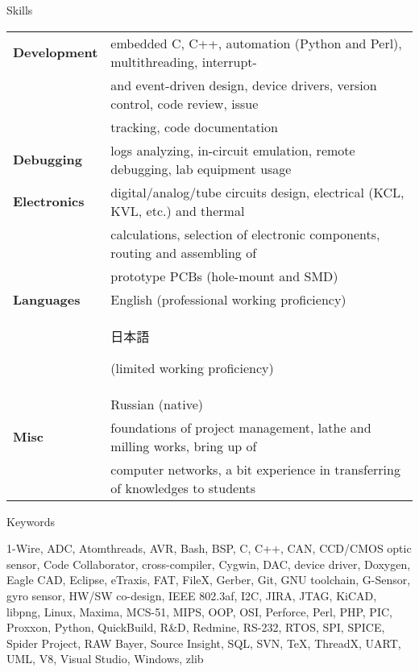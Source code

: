 \documentclass{template}
\begin{document}
\begin{rSection}{Skills}

\begin{tabular}{ @{} >{\bfseries}l @{\hspace{6ex}} l }
Development & embedded C, C++, automation (Python and Perl), multithreading, interrupt- \\
            & and event-driven design, device drivers, version control, code review, issue \\
            &  tracking, code documentation \\
Debugging   & logs analyzing, in-circuit emulation, remote debugging, lab equipment usage \\
Electronics & digital/analog/tube circuits design, electrical (KCL, KVL, etc.) and thermal \\
            & calculations, selection of electronic components, routing and assembling of \\
            & prototype PCBs (hole-mount and SMD) \\
Languages   & English (professional working proficiency) \\
            & \begin{CJK}{UTF8}{min}日本語\end{CJK} (limited working proficiency) \\
            & Russian (native) \\
Misc        & foundations of project management, lathe and milling works, bring up of \\
            & computer networks, a bit experience in transferring of knowledges to students
\end{tabular}

\end{rSection}


\begin{rSection}{Keywords}

1-Wire, ADC, Atomthreads, AVR, Bash, BSP, C, C++, CAN, CCD/CMOS optic sensor, Code Collaborator, cross-compiler, Cygwin, DAC, device driver, Doxygen, Eagle CAD, Eclipse, eTraxis, FAT, FileX, Gerber, Git, GNU toolchain, G-Sensor, gyro sensor, HW/SW co-design, IEEE 802.3af, I2C, JIRA, JTAG, KiCAD, libpng, Linux, Maxima, MCS-51, MIPS, OOP, OSI, Perforce, Perl, PHP, PIC, Proxxon, Python, QuickBuild, R\&D, Redmine, RS-232, RTOS, SPI, SPICE, Spider Project, RAW Bayer, Source Insight, SQL, SVN, \TeX, ThreadX, UART, UML, V8, Visual Studio, Windows, zlib

\end{rSection}
\end{document}
